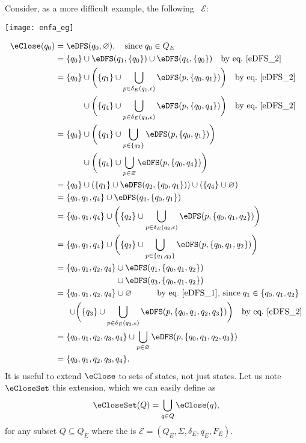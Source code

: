 Consider, as a more difficult example, the following
\eNFA~\(\mathcal{E}\):
\begin{center}
\texttt{[image: enfa\_eg]}
\end{center}
\begin{align*}
\eClose (q_0)
  &= \eDFS (q_0, \varnothing), \quad \text{since} \; q_0 \in Q_E\\
  &= \{q_0\} \cup \eDFS (q_1, \{q_0\}) \cup \eDFS (q_4, \{q_0\})
     \quad \text{by eq.~\ref{eDFS_2}}\\
  &= \{q_0\} \cup \biggl( \{q_1\} \cup
     \bigcup_{p \in \delta_E(q_1,\epsilon)}{\eDFS (p, \{q_0, q_1\})}\biggr)
     \quad \text{by eq.~\ref{eDFS_2}}\\
  &\mathrel{\phantom{=}} \phantom{\{q_0\}}{}
     \cup \biggl( \{q_4\} \cup
     \bigcup_{p \in \delta_E(q_4,\epsilon)}{\eDFS (p, \{q_0, q_4\})} \biggr)
     \quad \text{by eq.~\ref{eDFS_2}}\\
  &= \{q_0\} \cup \biggl( \{q_1\} \cup
     \bigcup_{p \in \{q_2\}}{\eDFS (p, \{q_0, q_1\})}\biggr)\\
  &\mathrel{\phantom{=}} \phantom{\{q_0\}}{}
     \cup \biggl( \{q_4\} \cup \bigcup_{p \in \varnothing}{\eDFS (p,
     \{q_0, q_4\})} \biggr)\\
  &= \{q_0\} \cup (\{q_1\} \cup \eDFS (q_2, \{q_0, q_1\}))
     \cup (\{q_4\} \cup \varnothing)\\
  &= \{q_0, q_1, q_4\} \cup \eDFS (q_2, \{q_0, q_1\})\\
  &= \{q_0, q_1, q_4\} \cup \biggl(\{q_2\} \cup \bigcup_{p \in
     \delta_E(q_2,\epsilon)}{\eDFS (p, \{q_0, q_1, q_2\})}\biggr)\\
  &= \{q_0, q_1, q_4\} \cup \biggl(\{q_2\} \cup \bigcup_{p \in
     \{q_1, q_3\}}{\eDFS (p, \{q_0, q_1, q_2\})}\biggr)\\
  &= \{q_0, q_1, q_2, q_4\} \cup \eDFS (q_1, \{q_0, q_1, q_2\})\\
  &\mathrel{\phantom{=}} \phantom{\{q_0,q_2,q_2,q_4\}} \cup \eDFS
     (q_3, \{q_0, q_1, q_2\})\\
  &= \{q_0, q_1, q_2, q_4\} \cup \varnothing \qquad\quad
     \text{by eq.~\ref{eDFS_1}, since} \; q_1 \in \{q_0, q_1, q_2\}\\
  &\mathrel{\phantom{=}} \;\,
     \cup \biggl(\{q_3\} \cup
     \bigcup_{p \in \delta_E(q_3, \epsilon)}{\eDFS (p, \{q_0, q_1, q_2, q_3\})}\biggr)
     \quad \text{by eq.~\ref{eDFS_2}}\\
  &= \{q_0, q_1, q_2, q_3, q_4\} \cup \bigcup_{p \in
     \varnothing}{\eDFS (p, \{q_0, q_1, q_2, q_3\})}\\
  &= \{q_0, q_1, q_2, q_3, q_4\}.
\end{align*}
It is useful to extend \(\eClose\) to sets of states, not just
states. Let us note \(\eCloseSet\) this extension, which we can easily
define as
\begin{equation*}
\eCloseSet (Q) = \bigcup_{q \in Q}{\eClose (q)},
\end{equation*}
for any subset \(Q \subseteq Q_E\) where the \eNFA is \(\mathcal{E} =
(Q_E, \Sigma, \delta_E, q_E, F_E)\).

